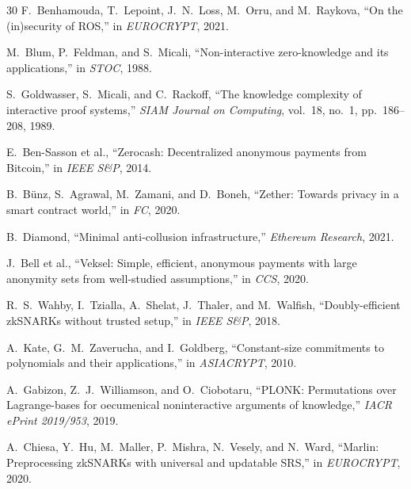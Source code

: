 \begin{thebibliography}{30}
F.~Benhamouda, T.~Lepoint, J.~N.~Loss, M.~Orru, and M.~Raykova, ``On the (in)security of ROS,'' in \emph{EUROCRYPT}, 2021.

M.~Blum, P.~Feldman, and S.~Micali, ``Non-interactive zero-knowledge and its applications,'' in \emph{STOC}, 1988.

S.~Goldwasser, S.~Micali, and C.~Rackoff, ``The knowledge complexity of interactive proof systems,'' \emph{SIAM Journal on Computing}, vol.~18, no.~1, pp.~186--208, 1989.

E.~Ben-Sasson et al., ``Zerocash: Decentralized anonymous payments from Bitcoin,'' in \emph{IEEE S\&P}, 2014.

B.~B\"unz, S.~Agrawal, M.~Zamani, and D.~Boneh, ``Zether: Towards privacy in a smart contract world,'' in \emph{FC}, 2020.

B.~Diamond, ``Minimal anti-collusion infrastructure,'' \emph{Ethereum Research}, 2021.

J.~Bell et al., ``Veksel: Simple, efficient, anonymous payments with large anonymity sets from well-studied assumptions,'' in \emph{CCS}, 2020.

R.~S.~Wahby, I.~Tzialla, A.~Shelat, J.~Thaler, and M.~Walfish, ``Doubly-efficient zkSNARKs without trusted setup,'' in \emph{IEEE S\&P}, 2018.

A.~Kate, G.~M.~Zaverucha, and I.~Goldberg, ``Constant-size commitments to polynomials and their applications,'' in \emph{ASIACRYPT}, 2010.

A.~Gabizon, Z.~J.~Williamson, and O.~Ciobotaru, ``PLONK: Permutations over Lagrange-bases for oecumenical noninteractive arguments of knowledge,'' \emph{IACR ePrint 2019/953}, 2019.

A.~Chiesa, Y.~Hu, M.~Maller, P.~Mishra, N.~Vesely, and N.~Ward, ``Marlin: Preprocessing zkSNARKs with universal and updatable SRS,'' in \emph{EUROCRYPT}, 2020.

\end{thebibliography}

